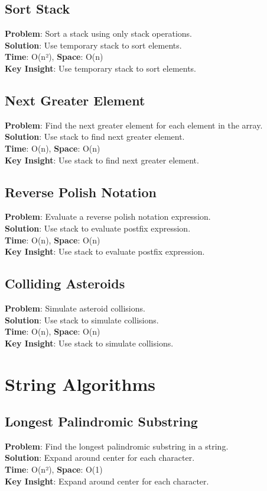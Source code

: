 \documentclass{report}
\begin{document}
\subsection{Sort Stack}
\textbf{Problem}: Sort a stack using only stack operations.\\
\textbf{Solution}: Use temporary stack to sort elements.\\
\textbf{Time}: O(n²), \textbf{Space}: O(n)\\
\textbf{Key Insight}: Use temporary stack to sort elements.

\subsection{Next Greater Element}
\textbf{Problem}: Find the next greater element for each element in the array.\\
\textbf{Solution}: Use stack to find next greater element.\\
\textbf{Time}: O(n), \textbf{Space}: O(n)\\
\textbf{Key Insight}: Use stack to find next greater element.

\subsection{Reverse Polish Notation}
\textbf{Problem}: Evaluate a reverse polish notation expression.\\
\textbf{Solution}: Use stack to evaluate postfix expression.\\
\textbf{Time}: O(n), \textbf{Space}: O(n)\\
\textbf{Key Insight}: Use stack to evaluate postfix expression.

\subsection{Colliding Asteroids}
\textbf{Problem}: Simulate asteroid collisions.\\
\textbf{Solution}: Use stack to simulate collisions.\\
\textbf{Time}: O(n), \textbf{Space}: O(n)\\
\textbf{Key Insight}: Use stack to simulate collisions.

\section{String Algorithms}

\subsection{Longest Palindromic Substring}
\textbf{Problem}: Find the longest palindromic substring in a string.\\
\textbf{Solution}: Expand around center for each character.\\
\textbf{Time}: O(n²), \textbf{Space}: O(1)\\
\textbf{Key Insight}: Expand around center for each character.
\end{document}
